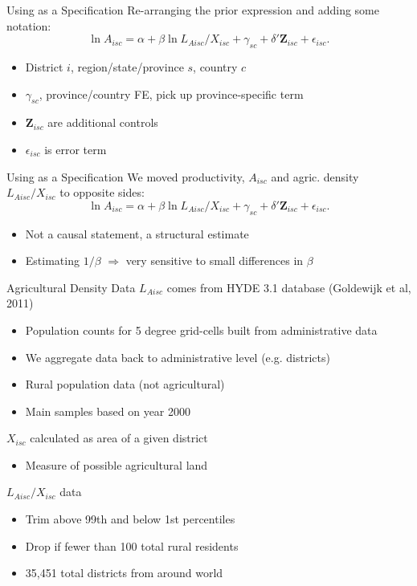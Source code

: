 \documentclass[10pt, xcolor=dvipsnames]{beamer}
\begin{document}
\begin{frame}{Using as a Specification}
Re-arranging the prior expression and adding some notation:
\begin{equation}
  \ln A_{isc} = \alpha + \beta \ln L_{Aisc}/X_{isc} + \gamma_{sc} + \delta' \mathbf{Z}_{isc} + \epsilon_{isc}. \label{EQ_regress}
\end{equation}

\begin{itemize}
  \item District $i$, region/state/province $s$, country $c$
  \item $\gamma_{sc}$, province/country FE, pick up province-specific term
  \item $\mathbf{Z}_{isc}$ are additional controls
  \item $\epsilon_{isc}$ is error term
\end{itemize}
\end{frame}

\begin{frame}{Using as a Specification}
We moved productivity, $A_{isc}$ and agric. density $L_{Aisc}/X_{isc}$ to opposite sides:
\begin{equation}
  \ln A_{isc} = \alpha + \beta \ln L_{Aisc}/X_{isc} + \gamma_{sc} + \delta' \mathbf{Z}_{isc} + \epsilon_{isc}. \label{EQ_regress}
\end{equation}

\begin{itemize}
  \item Not a causal statement, a structural estimate
  \item Estimating $1/\beta$ $\Rightarrow$ very sensitive to small differences in $\beta$
\end{itemize}
\end{frame}

\begin{frame}{Agricultural Density Data}
$L_{Aisc}$ comes from HYDE 3.1 database (Goldewijk et al, 2011)
\begin{itemize}
  \item Population counts for 5 degree grid-cells built from administrative data
  \item We aggregate data back to administrative level (e.g. districts)
  \item Rural population data (not agricultural)
  \item Main samples based on year 2000
\end{itemize}
$X_{isc}$ calculated as area of a given district
\begin{itemize}
  \item Measure of possible agricultural land
\end{itemize}
$L_{Aisc}/X_{isc}$ data 
\begin{itemize}
  \item Trim above 99th and below 1st percentiles
  \item Drop if fewer than 100 total rural residents
  \item 35,451 total districts from around world
\end{itemize}
\end{frame}
\end{document}
